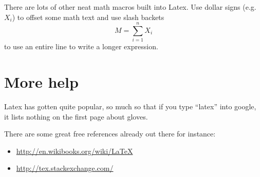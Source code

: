 \documentclass[11pt]{article}
\begin{document}
There are lots of other neat math macros built into Latex.  Use dollar signs (e.g. $X_i$) to offset some math text and use slash backets 
\[
M = \sum_{i=1}^n X_i
\]
to use an entire line to write a longer expression.  

\section{More help}
Latex has gotten quite popular, so much so that if you type ``latex'' into google, it lists nothing on the first page about gloves.  

There are some great free references already out there for instance:
\begin{itemize}
\item \url{http://en.wikibooks.org/wiki/LaTeX}
\item \url{http://tex.stackexchange.com/}
\end{itemize}
\end{document}
